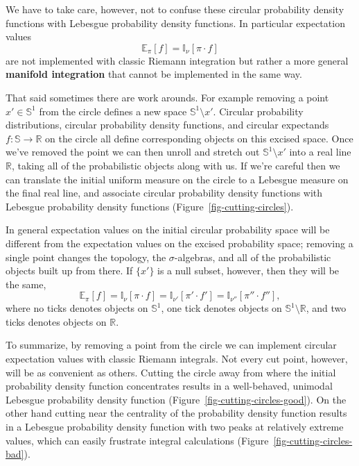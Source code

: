 \documentclass[
  letterpaper,
  DIV=11,
  numbers=noendperiod]{scrartcl}
\begin{document}
We have to take care, however, not to confuse these circular probability
density functions with Lebesgue probability density functions. In
particular expectation values \[
\mathbb{E}_{\pi}[f] = \mathbb{I}_{\nu}[\pi \cdot f]
\] are not implemented with classic Riemann integration but rather a
more general \textbf{manifold integration} that cannot be implemented in
the same way.

That said sometimes there are work arounds. For example removing a point
\(x' \in \mathbb{S}^{1}\) from the circle defines a new space
\(\mathbb{S}^{1} \setminus x'\). Circular probability distributions,
circular probability density functions, and circular expectands
\(f : \mathbb{S} \rightarrow \mathbb{R}\) on the circle all define
corresponding objects on this excised space. Once we've removed the
point we can then unroll and stretch out \(\mathbb{S}^{1} \setminus x'\)
into a real line \(\mathbb{R}\), taking all of the probabilistic objects
along with us. If we're careful then we can translate the initial
uniform measure on the circle to a Lebesgue measure on the final real
line, and associate circular probability density functions with Lebesgue
probability density functions (Figure~\ref{fig-cutting-circles}).

In general expectation values on the initial circular probability space
will be different from the expectation values on the excised probability
space; removing a single point changes the topology, the
\(\sigma\)-algebras, and all of the probabilistic objects built up from
there. If \(\{ x' \}\) is a null subset, however, then they will be the
same, \[
\mathbb{E}_{\pi}[f]
= \mathbb{I}_{\nu}[\pi \cdot f]
= \mathbb{I}_{\nu'}[\pi' \cdot f']
= \mathbb{I}_{\nu''}[\pi'' \cdot f''],
\] where no ticks denotes objects on \(\mathbb{S}^{1}\), one tick
denotes objects on \(\mathbb{S}^{1} \setminus \mathbb{R}\), and two
ticks denotes objects on \(\mathbb{R}\).

To summarize, by removing a point from the circle we can implement
circular expectation values with classic Riemann integrals. Not every
cut point, however, will be as convenient as others. Cutting the circle
away from where the initial probability density function concentrates
results in a well-behaved, unimodal Lebesgue probability density
function (Figure~\ref{fig-cutting-circles-good}). On the other hand
cutting near the centrality of the probability density function results
in a Lebesgue probability density function with two peaks at relatively
extreme values, which can easily frustrate integral calculations
(Figure~\ref{fig-cutting-circles-bad}).
\end{document}
